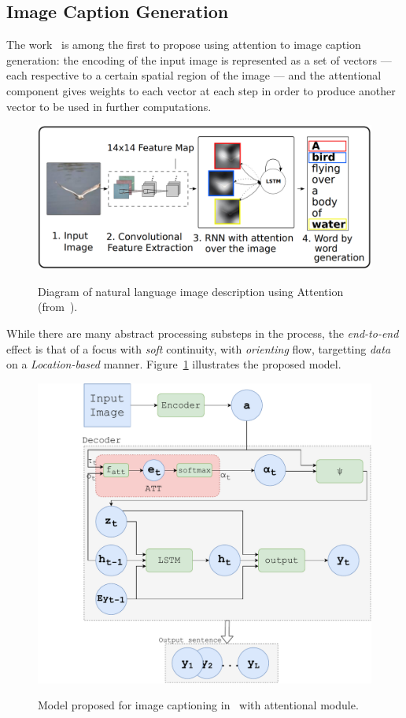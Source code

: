 \documentclass[11pt]{article}
\begin{document}
\subsection{Image Caption Generation}
The work~\cite{ref:show-attend-tell} is among the first to propose using
attention to image caption generation: the encoding of the input image is
represented as a set of vectors --- each respective to a certain spatial region of the image ---
and the attentional component gives weights to each vector at each step in order to produce another
vector to be used in further computations.

\begin{figure}[H]
    \centering
    \includegraphics[width=0.8\linewidth]{./img/img_captioning.png}\label{fig:imgcaptioning}
    \caption{Diagram of natural language image description using Attention
    (from~\cite{ref:img-captioning}).}
\end{figure}

While there are many abstract processing substeps in the process, the \emph{end-to-end} effect is that of
a focus with \emph{soft} continuity, with \emph{orienting} flow, targetting \emph{data}
on a \emph{Location-based} manner. Figure~\ref{fig:imgcaptioning} illustrates the proposed model.

\begin{figure}[H]
    \centering
    \includegraphics[width=0.8\linewidth]{./img/captioning.pdf}\label{fig:captioning}
    \caption{Model proposed for image captioning in~\cite{ref:show-attend-tell} with attentional module.}
\end{figure}
\end{document}
